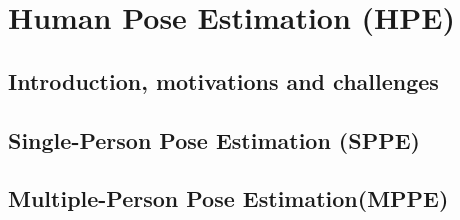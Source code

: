 \chapter{Human Pose Estimation (HPE)}

\section{Introduction, motivations and challenges}

\section{Single-Person Pose Estimation (SPPE)}

\section{Multiple-Person Pose Estimation(MPPE)}